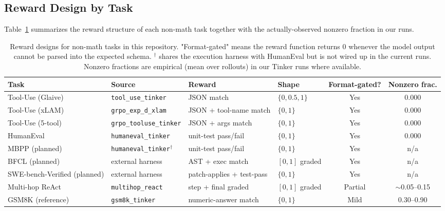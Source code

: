 \subsection{Reward Design by Task}
\label{subsec:reward-design}

Table~\ref{tab:reward-design} summarizes the reward structure of each
non-math task together with the actually-observed nonzero fraction in
our runs.

\begin{table}[ht]
\centering
\small
\begin{tabular}{@{}llllcc@{}}
\toprule
Task & Source & Reward & Shape & Format-gated? & Nonzero frac. \\
\midrule
Tool-Use (Glaive) & \texttt{tool\_use\_tinker}      & JSON match              & $\{0, 0.5, 1\}$ & Yes & 0.000 \\
Tool-Use (xLAM)   & \texttt{grpo\_exp\_d\_xlam}     & JSON + tool-name match  & $\{0, 1\}$      & Yes & 0.000 \\
Tool-Use (5-tool) & \texttt{grpo\_tooluse\_tinker}  & JSON + args match       & $\{0, 1\}$      & Yes & 0.000 \\
HumanEval         & \texttt{humaneval\_tinker}      & unit-test pass/fail     & $\{0, 1\}$      & Yes & 0.000 \\
MBPP (planned)    & \texttt{humaneval\_tinker}$^\dagger$ & unit-test pass/fail & $\{0, 1\}$      & Yes & n/a    \\
BFCL (planned)    & external harness                & AST + exec match        & $[0, 1]$ graded & Yes & n/a    \\
SWE-bench-Verified (planned) & external harness & patch-applies + test-pass & $\{0, 1\}$ & Yes & n/a \\
Multi-hop ReAct   & \texttt{multihop\_react}        & step + final graded     & $[0, 1]$ graded & Partial & $\sim$0.05--0.15 \\
GSM8K (reference) & \texttt{gsm8k\_tinker}          & numeric-answer match    & $\{0, 1\}$      & Mild    & 0.30--0.90 \\
\bottomrule
\end{tabular}
\caption{Reward designs for non-math tasks in this repository. "Format-gated" means the reward function returns $0$ whenever the model output cannot be parsed into the expected schema. $^\dagger$ shares the execution harness with HumanEval but is not wired up in the current runs. Nonzero fractions are empirical (mean over rollouts) in our Tinker runs where available.}
\label{tab:reward-design}
\end{table}


